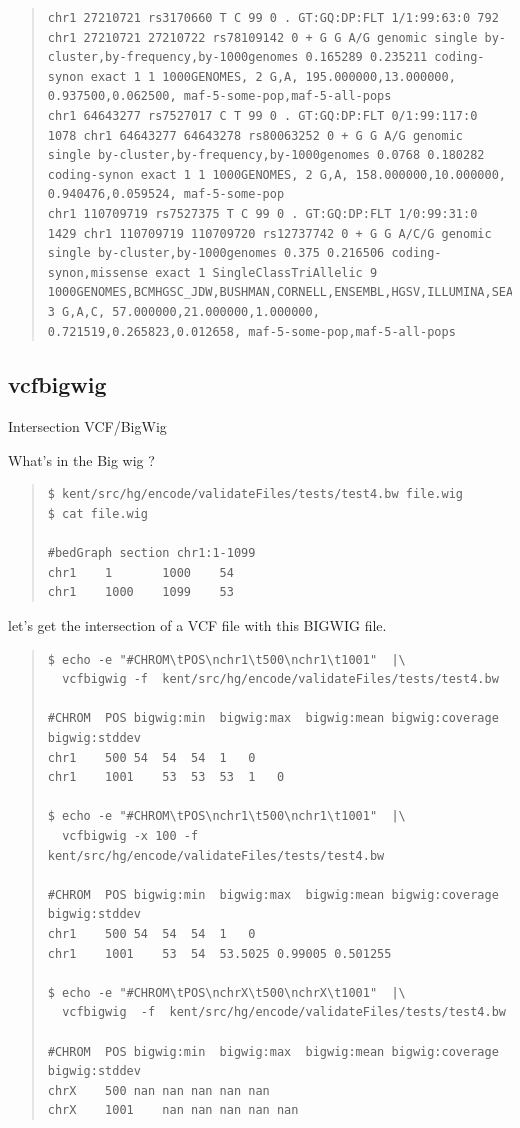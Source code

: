 \documentclass[12pt]{article}
\begin{document}
\begin{quote}
\begin{verbatim}
chr1 27210721 rs3170660 T C 99 0 . GT:GQ:DP:FLT 1/1:99:63:0 792 chr1 27210721 27210722 rs78109142 0 + G G A/G genomic single by-cluster,by-frequency,by-1000genomes 0.165289 0.235211 coding-synon exact 1 1 1000GENOMES, 2 G,A, 195.000000,13.000000, 0.937500,0.062500, maf-5-some-pop,maf-5-all-pops
chr1 64643277 rs7527017 C T 99 0 . GT:GQ:DP:FLT 0/1:99:117:0 1078 chr1 64643277 64643278 rs80063252 0 + G G A/G genomic single by-cluster,by-frequency,by-1000genomes 0.0768 0.180282 coding-synon exact 1 1 1000GENOMES, 2 G,A, 158.000000,10.000000, 0.940476,0.059524, maf-5-some-pop
chr1 110709719 rs7527375 T C 99 0 . GT:GQ:DP:FLT 1/0:99:31:0 1429 chr1 110709719 110709720 rs12737742 0 + G G A/C/G genomic single by-cluster,by-1000genomes 0.375 0.216506 coding-synon,missense exact 1 SingleClassTriAllelic 9 1000GENOMES,BCMHGSC_JDW,BUSHMAN,CORNELL,ENSEMBL,HGSV,ILLUMINA,SEATTLESEQ,SSAHASNP, 3 G,A,C, 57.000000,21.000000,1.000000, 0.721519,0.265823,0.012658, maf-5-some-pop,maf-5-all-pops
\end{verbatim}
\end{quote}

\subsection{vcfbigwig}
Intersection VCF/BigWig

What's in the Big wig ?
\begin{quote}
\begin{verbatim}
$ kent/src/hg/encode/validateFiles/tests/test4.bw file.wig
$ cat file.wig

#bedGraph section chr1:1-1099
chr1    1       1000    54
chr1    1000    1099    53
\end{verbatim}
\end{quote}

let's get the intersection of a VCF file with this BIGWIG file.

\begin{quote}
\begin{verbatim}
$ echo -e "#CHROM\tPOS\nchr1\t500\nchr1\t1001"  |\
  vcfbigwig -f  kent/src/hg/encode/validateFiles/tests/test4.bw
  
#CHROM	POS	bigwig:min	bigwig:max	bigwig:mean	bigwig:coverage	bigwig:stddev
chr1	500	54	54	54	1	0
chr1	1001	53	53	53	1	0

$ echo -e "#CHROM\tPOS\nchr1\t500\nchr1\t1001"  |\
  vcfbigwig -x 100 -f  kent/src/hg/encode/validateFiles/tests/test4.bw
  
#CHROM	POS	bigwig:min	bigwig:max	bigwig:mean	bigwig:coverage	bigwig:stddev
chr1	500	54	54	54	1	0
chr1	1001	53	54	53.5025	0.99005	0.501255

$ echo -e "#CHROM\tPOS\nchrX\t500\nchrX\t1001"  |\
  vcfbigwig  -f  kent/src/hg/encode/validateFiles/tests/test4.bw
  
#CHROM	POS	bigwig:min	bigwig:max	bigwig:mean	bigwig:coverage	bigwig:stddev
chrX	500	nan	nan	nan	nan	nan
chrX	1001	nan	nan	nan	nan	nan
\end{verbatim}
\end{quote}
\end{document}
